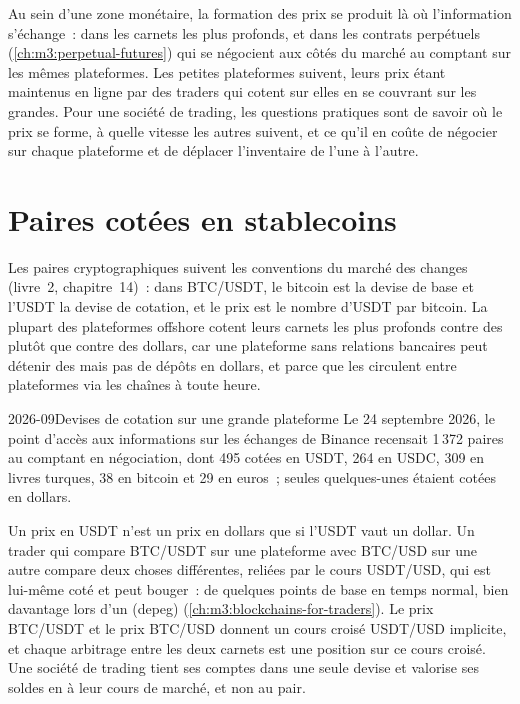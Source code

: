 Au sein d'une zone monétaire, la formation des prix se produit là où l'information s'échange~: dans les carnets les plus profonds, et dans les
contrats perpétuels (\cref{ch:m3:perpetual-futures}) qui se négocient aux côtés du marché au comptant sur les mêmes plateformes.
Les petites plateformes suivent, leurs prix étant maintenus en ligne par des traders qui cotent sur elles en se couvrant sur les grandes.
Pour une société de trading, les questions pratiques sont de savoir où le prix se forme, à quelle vitesse les autres suivent,
et ce qu'il en coûte de négocier sur chaque plateforme et de déplacer l'inventaire de l'une à l'autre.

\section{Paires cotées en stablecoins}

Les paires cryptographiques suivent les conventions du marché des changes (livre~2, chapitre~14)~: dans BTC/USDT, le bitcoin
est la devise de base et l'USDT la devise de cotation, et le prix est le nombre d'USDT par bitcoin.
La plupart des plateformes offshore cotent leurs carnets les plus profonds contre des  plutôt que contre des dollars, car une plateforme
sans relations bancaires peut détenir des  mais pas de dépôts en dollars, et parce que les  circulent entre plateformes
via les chaînes à toute heure.

\begin{dated}{2026-09}{Devises de cotation sur une grande plateforme}\label{dat:m3:spot-markets:quotes}
Le 24 septembre 2026, le point d'accès aux informations sur les échanges de Binance recensait 1\,372 paires au comptant en négociation, dont
495 cotées en USDT, 264 en USDC, 309 en livres turques, 38 en bitcoin et 29 en euros~; seules quelques-unes
étaient cotées en dollars.
\end{dated}

Un prix en USDT n'est un prix en dollars que si l'USDT vaut un dollar. Un trader qui compare BTC/USDT sur une plateforme
avec BTC/USD sur une autre compare deux choses différentes, reliées par le cours USDT/USD, qui est lui-même coté
et peut bouger~: de quelques points de base en temps normal, bien davantage lors d'un  (depeg)
(\cref{ch:m3:blockchains-for-traders}). Le prix BTC/USDT et le prix BTC/USD donnent un cours croisé USDT/USD implicite, et chaque arbitrage entre les deux carnets
est une position sur ce cours croisé. Une société de trading tient ses comptes dans une seule devise
et valorise ses soldes en  à leur cours de marché, et non au pair.

